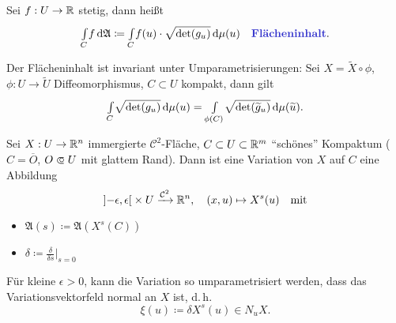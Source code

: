 \documentclass{cheat-sheet}
\newcommand{\A}{\mathfrak{A}}
\begin{document}
\begin{defn}
  Sei $f : U \to \mathbb{R}$ stetig, dann heißt
  \[ \Int{C}{}{f}{\A} \coloneqq \Int{C}{}{f(u) \cdot \sqrt{\det(g_u)}}{\mu (u)} \quad \text{\emph{Flächeninhalt}.} \]
\end{defn}

\begin{prop}
  Der Flächeninhalt ist invariant unter Umparametrisierungen: Sei $X = \widetilde{X} \circ \phi$, $\phi : U \to \widetilde{U}$ Diffeomorphismus, $C \subset U$ kompakt, dann gilt
  \[ {\textstyle \int\limits_{C}^{}} \sqrt{\det(g_u)} \,\mathrm{d} \mu (u) = {\textstyle \int\limits_{\phi(C)}^{}} \sqrt{\det(\widetilde{g}_u)} \,\mathrm{d} \mu (\widetilde{u}). \]
\end{prop}



\begin{defn}
  Sei $X : U \to \mathbb{R}^n$ immergierte $\mathcal{C}^2$-Fläche,
  $C \subset U \subset \mathbb{R}^m$ "`schönes"' Kompaktum ($C = \overline{O}$, $O \opn U$ mit glattem Rand).
  Dann ist eine Variation von $X$ auf $C$ eine Abbildung
  \[
    \left] -\epsilon, \epsilon \right[ \times U \xrightarrow{\mathcal{C}^2} \mathbb{R}^n, \quad
    (x, u) \mapsto X^s(u) \quad \text{mit}
  \]
  \begin{itemize}
  \end{itemize}
\end{defn}

\begin{nota}
  \begin{multicols}{2}
    \begin{itemize}
      \item $\A(s) \coloneqq \A(X^s(C))$
      \item $\delta \coloneqq \tfrac{\delta}{\delta s}|_{s = 0}$
    \end{itemize}
  \end{multicols}
\end{nota}

\begin{lem}
  Für kleine $\epsilon > 0$, kann die Variation so umparametrisiert werden, dass das Variationsvektorfeld normal an $X$ ist, d.\,h.
  \[ \xi(u) \coloneqq \delta X^s(u) \in N_u X. \]
\end{lem}
\end{document}
